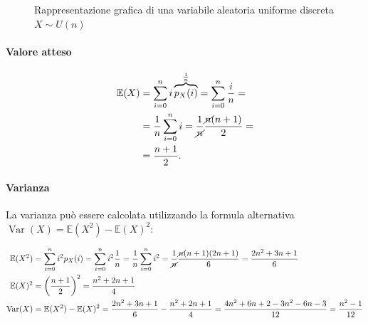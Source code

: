 \begin{figure}[h]
{{
    }
}
    \caption{Rappresentazione grafica di una variabile aleatoria uniforme discreta $X \sim U{(n)}$}
    \label{fig:mod_unif_discr}
\end{figure}

\paragraph{Valore atteso}
\begin{align*}
\mathbb{E}(X) &= \sum_{i=0}^n i \overbrace{p_X(i)}^{\frac{1}{n}} = \sum_{i=0}^n \frac{i}{n} = \\ 
&=\frac{1}{n} \sum_{i=0}^n i = \frac{1}{\cancel{n}} \frac{\cancel{n}(n+1)}{2} = \\ 
&= \frac{n+1}{2}.
\end{align*}

\paragraph{Varianza} La varianza può essere calcolata utilizzando la formula alternativa
$\operatorname{Var}(X) = \mathbb{E}(X^2) - \mathbb{E}(X)^2$:

\begin{align*}
\mathbb{E}(X^2) &= \sum_{i=0}^n i^2 p_X(i) = \sum_{i=0}^n i^2 \frac{1}{n} = \frac{1}{n} \sum_{i=0}^n i^2 = \frac{1}{\cancel{n}} \frac{\cancel{n}(n+1)(2n+1)}{6} = \frac{2n^2 + 3n + 1}{6} \\
%
\mathbb{E}(X)^2 &= \left (\frac{n+1}{2} \right )^2 = \frac{n^2 + 2n + 1}{4} \\
%
\operatorname{Var}(X) &= \mathbb{E}(X^2) - \mathbb{E}(X)^2 = \frac{2n^2 + 3n + 1}{6} - \frac{n^2 + 2n + 1}{4} = \frac{4n^2 + 6n + 2 - 3n^2 - 6n - 3}{12} = \frac{n^2 - 1}{12}
\end{align*}



